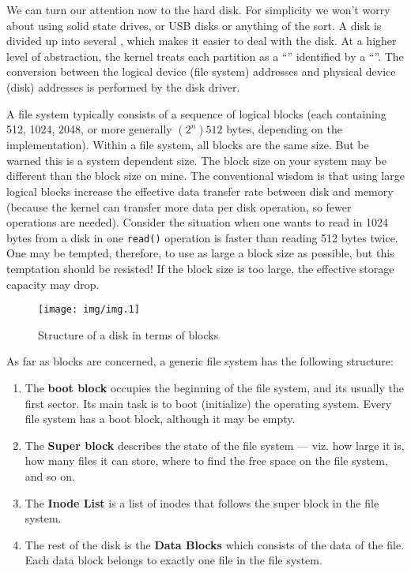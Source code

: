 We can turn our attention now to the hard disk. For simplicity we
won't worry about using solid state drives, or USB disks or
anything of the sort. A disk is divided up into several
, which makes it easier to deal with the
disk. At a higher level of abstraction, the kernel treats each
partition as a ``'' identified by a
``''. The conversion between the logical
device (file system) addresses and physical device (disk)
addresses is performed by the disk driver.

A file system typically consists of a sequence of logical blocks
(each containing 512, 1024, 2048, or more generally $(2^{n})512$
bytes, depending on the implementation). Within a file system,
all blocks are the same size. But be warned this is a system
dependent size. The block size on your system may be different
than the block size on mine. The conventional wisdom is that
using large logical blocks increase the effective data transfer
rate between disk and memory (because the kernel can transfer
more data per disk operation, so fewer operations are needed).
Consider the situation when one wants to read in 1024
bytes from a disk in one {\tt read()} operation is faster than
reading 512 bytes twice. One may be tempted, therefore, to use as
large a block size as possible, but this temptation should be
resisted! If the block size is too large, the effective storage
capacity may drop.

\begin{figure}[H]
\begin{center}
\texttt{[image: img/img.1]}
\vspace{-1.5pc}
\end{center}
\caption{Structure of a disk in terms of blocks}\label{fig:img1}
\vspace{-0.875pc}
\end{figure}

As far as blocks are concerned, a generic file system has the
following structure:
\begin{enumerate}
\item The \textbf{boot block} occupies the
  beginning of the file system, and its usually the first
  sector. Its main task is to boot (initialize) the operating
  system. Every file system has a boot block, although it may be
  empty.
\item The \textbf{Super block} describes the
  state of the file system --- viz. how large it is, how many
  files it can store, where to find the free space on the file
  system, and so on.
\item The \textbf{Inode List} is a list of
  inodes that follows the super block in the file system.
\item The rest of the disk is the \textbf{Data Blocks}
  which consists of the data of the file. Each data block belongs
  to exactly one file in the file system.
\end{enumerate}
